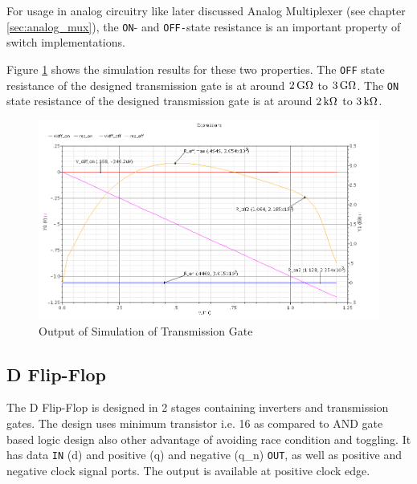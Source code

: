 \documentclass[parskip,oneside,colorbacktitle,10pt,accentcolor=tud1b,table]{tudreport}
\begin{document}
{\begin{minipage}[t]{0.35\textwidth}
	\setlength{\parskip}{\currentparskip} %
	For usage in analog circuitry like later discussed Analog Multiplexer (see chapter \ref{sec:analog_mux}), the \texttt{ON}- and \texttt{OFF-}state resistance is an important property of switch implementations.
	
	Figure \ref{fig:txgate_res} shows the simulation results for these two properties. The \texttt{OFF} state resistance of the designed transmission gate is at around $\unit[2]{G\Omega}$ to $\unit[3]{G\Omega}$. The \texttt{ON} state resistance of the designed transmission gate is at around $\unit[2]{k\Omega}$ to $\unit[3]{k\Omega}$. 
\end{minipage}
\begin{minipage}[t]{0.55\textwidth}
\begin{figure}[H]
     \begin{center}
         \includegraphics[scale=0.35]{txgate_res}
         \caption{Output of Simulation of Transmission Gate}
         \label{fig:txgate_res}
    \end{center}
\end{figure}
\end{minipage}

\subsection{D Flip-Flop}

The D Flip-Flop is designed in 2 stages containing inverters and transmission gates. The design uses minimum transistor i.e. 16 as compared to AND gate based logic design also other advantage of avoiding race condition and toggling. It has data \texttt{IN} (d) and positive (q) and negative (q\_n) \texttt{OUT}, as well as positive and negative clock signal ports. The output is available at positive clock edge. 

}
\end{document}
